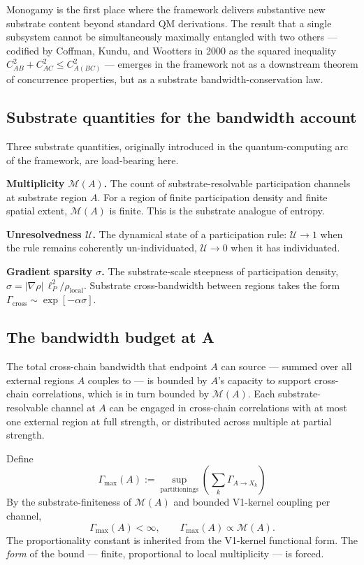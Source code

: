 \documentclass[11pt,a4paper]{article}
\begin{document}
Monogamy is the first place where the framework delivers substantive new substrate content beyond standard QM derivations. The result that a single subsystem cannot be simultaneously maximally entangled with two others --- codified by Coffman, Kundu, and Wootters in 2000 as the squared inequality $C_{AB}^2 + C_{AC}^2 \leq C_{A(BC)}^2$ --- emerges in the framework not as a downstream theorem of concurrence properties, but as a substrate bandwidth-conservation law.

\subsection{Substrate quantities for the bandwidth account}

Three substrate quantities, originally introduced in the quantum-computing arc of the framework, are load-bearing here.

\textbf{Multiplicity $\mathcal{M}(A)$.} The count of substrate-resolvable participation channels at substrate region $A$. For a region of finite participation density and finite spatial extent, $\mathcal{M}(A)$ is finite. This is the substrate analogue of entropy.

\textbf{Unresolvedness $\mathcal{U}$.} The dynamical state of a participation rule: $\mathcal{U} \to 1$ when the rule remains coherently un-individuated, $\mathcal{U} \to 0$ when it has individuated.

\textbf{Gradient sparsity $\sigma$.} The substrate-scale steepness of participation density, $\sigma = |\nabla\rho|\,\ell_P^2 / \rho_{\mathrm{local}}$. Substrate cross-bandwidth between regions takes the form $\Gamma_{\mathrm{cross}} \sim \exp[-\alpha\sigma]$.

\subsection{The bandwidth budget at A}

The total cross-chain bandwidth that endpoint $A$ can source --- summed over all external regions $A$ couples to --- is bounded by $A$'s capacity to support cross-chain correlations, which is in turn bounded by $\mathcal{M}(A)$. Each substrate-resolvable channel at $A$ can be engaged in cross-chain correlations with at most one external region at full strength, or distributed across multiple at partial strength.

Define
\[
\Gamma_{\max}(A) := \sup_{\text{partitionings}} \left(\sum_k \Gamma_{A \to X_k}\right)
\]
By the substrate-finiteness of $\mathcal{M}(A)$ and bounded V1-kernel coupling per channel,
\[
\Gamma_{\max}(A) < \infty, \qquad \Gamma_{\max}(A) \propto \mathcal{M}(A).
\]
The proportionality constant is inherited from the V1-kernel functional form. The \emph{form} of the bound --- finite, proportional to local multiplicity --- is forced.
\end{document}
